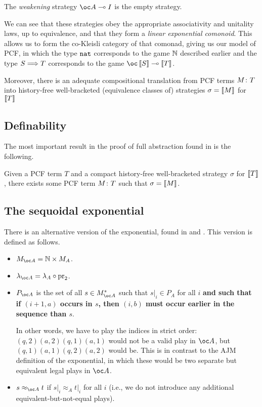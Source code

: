 \documentclass{article}
\begin{document}
The \emph{weakening} strategy $\oc A \implies I$ is the empty strategy.

We can see that these strategies obey the appropriate associativity and unitality laws, up to equivalence, and that they form a \emph{linear exponential comonoid}. 
This allows us to form the co-Kleisli category of that comonad, giving us our model of PCF, in which the type ${\mathtt{nat}}$ corresponds to the game $\mathbb{N}$ described earlier and the type $S\Longrightarrow T$ corresponds to the game $\oc\deno{S}\implies \deno{T}$.

Moreover, there is an adequate compositional translation from PCF terms $M\colon T$ into history-free well-bracketed (equivalence classes of) strategies $\sigma=\left\llbracket M\right\rrbracket$ for $\left\llbracket T\right\rrbracket$

\subsection{Definability}

The most important result in the proof of full abstraction found in \cite{ajmPcf} is the following.

\begin{theorem}
  Given a PCF term $T$ and a compact history-free well-bracketed strategy $\sigma$ for $\left\llbracket T\right\rrbracket$, there exists some PCF term $M\colon T$ such that $\sigma=\left\llbracket M\right\rrbracket$.
\end{theorem}

\subsection{The sequoidal exponential}

There is an alternative version of the exponential, found in \cite{blassgames} and \cite{hyland1997games}.  
This version is defined as follows.
\begin{itemize}
  \item $M_{\oc A} = \bN\times M_A$.
  \item $\lambda_{\oc A} = \lambda_A \circ \pr_2$.
  \item $P_{\oc A}$ is the set of all $s\in M_{\oc A}^*$ such that $s\vert_i\in P_A$ for all $i$ \textbf{and such that if $(i+1,a)$ occurs in $s$, then $(i,b)$ must occur earlier in the sequence than $s$}.  
    
    In other words, we have to play the indices in strict order: $(q,2)(a,2)(q,1)(a,1)$ would not be a valid play in $\oc A$, but $(q,1)(a,1)(q,2)(a,2)$ would be.  
    This is in contrast to the AJM definition of the exponential, in which these would be two separate but equivalent legal plays in $\oc A$.
  \item $s\approx_{\oc A}t$ if $s\vert_i\approx_A t\vert_i$ for all $i$ (i.e., we do not introduce any additional equivalent-but-not-equal plays).
\end{itemize}
\end{document}
